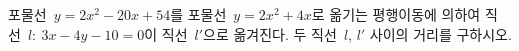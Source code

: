 포물선~$y=2x^2-20x+54$를 포물선~$y=2x^2+4x$로 옮기는 평행이동에 의하여 직선~$l:\ 3x-4y-10=0$이 직선~$l'$으로 옮겨진다. 두 직선~$l$, $l'$ 사이의 거리를 구하시오.
